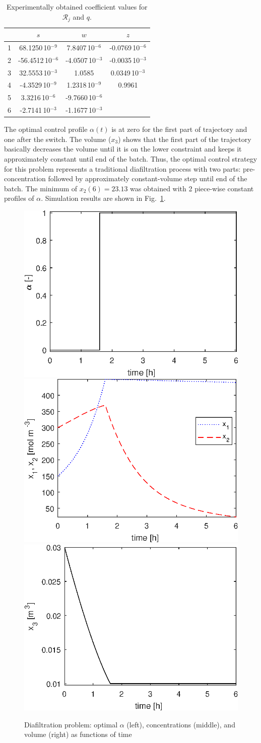 \begin{table}
  \caption{Experimentally obtained coefficient values for $\mathcal{R}_j$ and $q$.}
  \label{tab:coefficients}
  \centering
  \begin{tabular}{lccc}
    & $s$ & $w$ & $z$ \\ \hline
1  &68.1250\,10$^{-9}$ &7.8407\,10$^{-6}$ &  -0.0769\,10$^{-6}$\\
2  &-56.4512\,10$^{-6}$ &-4.0507\,10$^{-3}$ & -0.0035\,10$^{-3}$ \\
3  & 32.5553\,10$^{-3}$& 1.0585&  0.0349\,10$^{-3}$\\
4  & -4.3529\,10$^{-9}$& 1.2318\,10$^{-9}$& 0.9961 \\
5  & 3.3216\,10$^{-6}$& -9.7660\,10$^{-6}$&  \\
6  & -2.7141\,10$^{-3}$& -1.1677\,10$^{-3}$&  \\
  \end{tabular}
\end{table}

The optimal control profile $\alpha(t)$ is at zero for the first part
of trajectory and one after the switch.  The volume ($x_3$) shows that
the first part of the trajectory basically decreases the volume until
it is on the lower constraint and keeps it approximately constant
until end of the batch. Thus, the optimal control strategy for this
problem represents a traditional diafiltration process with two parts:
pre-concentration followed by approximately constant-volume step until
end of the batch.  The minimum of $x_2(6) = 23.13$ was obtained with
2 piece-wise constant profiles of $\alpha$. Simulation results are
shown in Fig.~\ref{fig:problem-a}.

\begin{figure}[!h]
  \centering
  \includegraphics[width=0.32\linewidth]{examples/problem9/graphs/a-alpha}
  \includegraphics[width=0.32\linewidth]{examples/problem9/graphs/a-x12} 
  \includegraphics[width=0.32\linewidth]{examples/problem9/graphs/a-x3}
  \caption{Diafiltration problem: optimal $\alpha$ (left),
    concentrations (middle), and volume (right) as functions of time}
  \label{fig:problem-a}
\end{figure}

